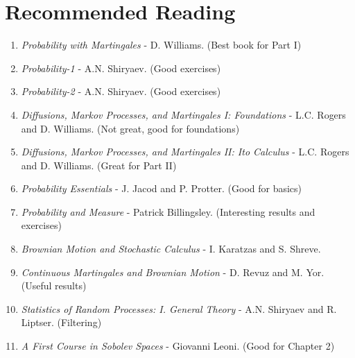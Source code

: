 \documentclass[11pt,a4paper]{article}
\theoremstyle{definition}
\begin{document}
\section{Recommended Reading}
\begin{enumerate}
    \item \textit{Probability with Martingales} - D. Williams. (Best book for Part I)
    \item \textit{Probability-1} - A.N. Shiryaev. (Good exercises)
    \item \textit{Probability-2} - A.N. Shiryaev. (Good exercises)
    \item \textit{Diffusions, Markov Processes, and Martingales I: Foundations} - L.C. Rogers and D. Williams. (Not great, good for foundations)
    \item \textit{Diffusions, Markov Processes, and Martingales II: Ito Calculus} - L.C. Rogers and D. Williams. (Great for Part II)
    \item \textit{Probability Essentials} - J. Jacod and P. Protter. (Good for basics)
    \item \textit{Probability and Measure} - Patrick Billingsley. (Interesting results and exercises)
    \item \textit{Brownian Motion and Stochastic Calculus} - I. Karatzas and S. Shreve. 
    \item \textit{Continuous Martingales and Brownian Motion} - D. Revuz and M. Yor. (Useful results)
    \item \textit{Statistics of Random Processes: I. General Theory} - A.N. Shiryaev and R. Liptser. (Filtering)
    \item \textit{A First Course in Sobolev Spaces} - Giovanni Leoni. (Good for Chapter 2)
\end{enumerate}
\end{document}
